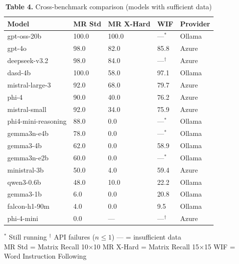 \documentclass[11pt,letterpaper]{article}
\begin{document}
\begin{table}[h!]
\centering
\caption*{\textbf{Table 4.} Cross-benchmark comparison (models with sufficient data)}
\begin{tabular}{l R{2.0cm} R{2.0cm} R{2.0cm} l}
\toprule
\textbf{Model} & \textbf{MR Std} & \textbf{MR X-Hard} & \textbf{WIF} & \textbf{Provider} \\
\midrule
{} gpt-oss-20b         & 100.0 & 100.0 &  ---$^{*}$ & Ollama \\
 gpt-4o              &  98.0 &  82.0 & 85.8 & Azure \\
 deepseek-v3.2       &  98.0 &  84.0 &  ---$^{\dag}$ & Azure \\
 dasd-4b             & 100.0 &  58.0 & 97.1 & Ollama \\
mistral-large-3     &  92.0 &  68.0 & 79.7 & Azure \\
phi-4               &  90.0 &  40.0 & 76.2 & Azure \\
mistral-small       &  92.0 &  34.0 & 75.9 & Azure \\
phi4-mini-reasoning &  88.0 &   0.0 &  ---$^{*}$ & Ollama \\
gemma3n-e4b         &  78.0 &   0.0 &  ---$^{*}$ & Ollama \\
gemma3-4b           &  62.0 &   0.0 & 58.9 & Ollama \\
gemma3n-e2b         &  60.0 &   0.0 &  ---$^{*}$ & Ollama \\
ministral-3b        &  50.0 &   4.0 & 59.4 & Azure \\
qwen3-0.6b          &  48.0 &  10.0 & 22.2 & Ollama \\
gemma3-1b           &   6.0 &   0.0 & 20.8 & Ollama \\
falcon-h1-90m       &   4.0 &   0.0 &  9.5 & Ollama \\
phi-4-mini          &   0.0 &  --- &  ---$^{\dag}$ & Azure \\
\bottomrule
\end{tabular}

\vspace{4pt}
{\footnotesize
$^{*}$ Still running \quad
$^{\dag}$ API failures ($n \leq 1$) \quad
--- = insufficient data \\
MR Std = Matrix Recall 10$\times$10 \quad MR X-Hard = Matrix Recall 15$\times$15 \quad WIF = Word Instruction Following
}
\end{table}

\vspace{0.5cm}
\end{document}
